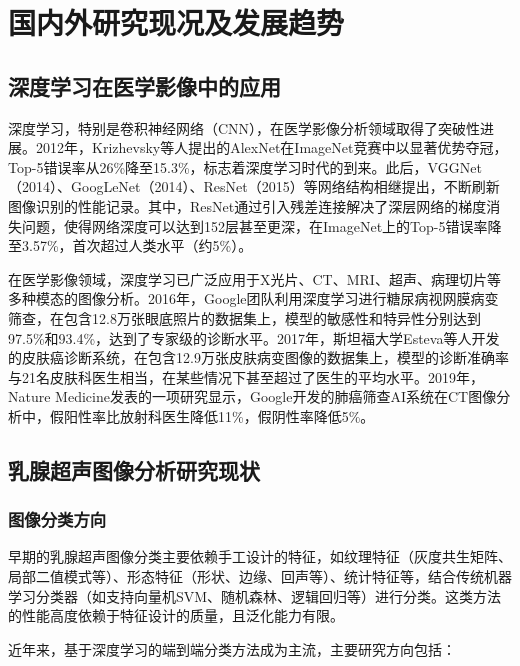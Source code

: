 \documentclass[supercite]{Hust-undergraduate-kaiti}
\theoremstyle{definition}
\begin{document}
\section{国内外研究现况及发展趋势}

\subsection{深度学习在医学影像中的应用}

深度学习，特别是卷积神经网络（CNN），在医学影像分析领域取得了突破性进展。2012年，Krizhevsky等人提出的AlexNet\cite{ref1}在ImageNet竞赛中以显著优势夺冠，Top-5错误率从26\%降至15.3\%，标志着深度学习时代的到来。此后，VGGNet（2014）、GoogLeNet（2014）、ResNet\cite{ref2}（2015）等网络结构相继提出，不断刷新图像识别的性能记录。其中，ResNet通过引入残差连接解决了深层网络的梯度消失问题，使得网络深度可以达到152层甚至更深，在ImageNet上的Top-5错误率降至3.57\%，首次超过人类水平（约5\%）。

在医学影像领域，深度学习已广泛应用于X光片、CT、MRI、超声、病理切片等多种模态的图像分析。2016年，Google团队利用深度学习进行糖尿病视网膜病变筛查，在包含12.8万张眼底照片的数据集上，模型的敏感性和特异性分别达到97.5\%和93.4\%，达到了专家级的诊断水平。2017年，斯坦福大学Esteva等人开发的皮肤癌诊断系统，在包含12.9万张皮肤病变图像的数据集上，模型的诊断准确率与21名皮肤科医生相当，在某些情况下甚至超过了医生的平均水平。2019年，Nature Medicine发表的一项研究显示，Google开发的肺癌筛查AI系统在CT图像分析中，假阳性率比放射科医生降低11\%，假阴性率降低5\%。

\subsection{乳腺超声图像分析研究现状}

\subsubsection{图像分类方向}

早期的乳腺超声图像分类主要依赖手工设计的特征，如纹理特征（灰度共生矩阵、局部二值模式等）、形态特征（形状、边缘、回声等）、统计特征等，结合传统机器学习分类器（如支持向量机SVM、随机森林、逻辑回归等）进行分类。这类方法的性能高度依赖于特征设计的质量，且泛化能力有限。

近年来，基于深度学习的端到端分类方法成为主流，主要研究方向包括：
\end{document}
